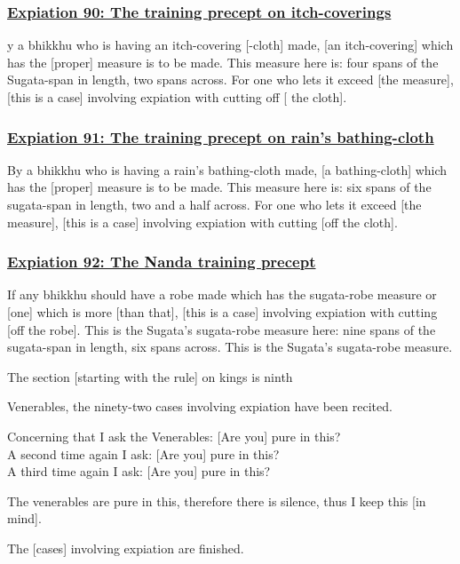 \subsubsection*{\hyperref[pac90]{Expiation 90: The training precept on itch-coverings}}
\label{exp90}
y a bhikkhu who is having an itch-covering [-cloth] made, [an itch-covering] which has the [proper] measure is to be made. This measure here is: four spans of the Sugata-span in length, two spans across. For one who lets it exceed [the measure], [this is a case] involving expiation with cutting off [ the cloth].



\subsubsection*{\hyperref[pac91]{Expiation 91: The training precept on rain's bathing-cloth}}
\label{exp91}
By a bhikkhu who is having a rain's bathing-cloth made, [a bathing-cloth] which has the [proper] measure is to be made. This measure here is: six spans of the sugata-span in length, two and a half across. For one who lets it exceed [the measure], [this is a case] involving expiation with cutting [off the cloth].



\subsubsection*{\hyperref[pac92]{Expiation 92: The Nanda training precept}}
\label{exp92}
If any bhikkhu should have a robe made which has the sugata-robe measure or [one] which is more [than that], [this is a case] involving expiation with cutting [off the robe]. This is the Sugata's sugata-robe measure here: nine spans of the sugata-span in length, six spans across. This is the Sugata's sugata-robe measure.

\begin{center}
	The section [starting with the rule] on kings is ninth
\end{center}



\medskip

\begin{center}
	Venerables, the ninety-two cases involving expiation have been recited.

	\smallskip

	Concerning that I ask the Venerables: [Are you] pure in this?\\
	A second time again I ask: [Are you] pure in this?\\
	A third time again I ask: [Are you] pure in this?

	\smallskip

	The venerables are pure in this, therefore there is silence, thus I keep this [in mind].
\end{center}

\begin{outro}
	The [cases] involving expiation are finished.
\end{outro}

\clearpage

